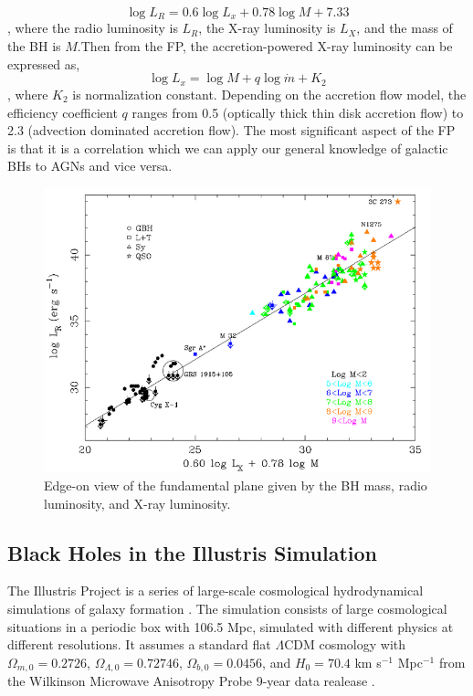 \documentclass[12pt]{article}
\begin{document}
\begin{equation}
\log L_R=0.6 \log L_x+0.78 \log M+7.33
\end{equation}
, where the radio luminosity is $L_R$, the X-ray luminosity is $L_X$, and the mass of the BH is $M$.Then from the FP, the accretion-powered X-ray luminosity can be expressed as,
\begin{equation}
\log L_x = \log M+q \log \dot{m}+K_2
\label{LxFP}
\end{equation}
, where $K_2$ is normalization constant. Depending on the accretion flow model, the efficiency coefficient $q$ ranges from 0.5 (optically thick thin disk accretion flow) to 2.3 (advection dominated accretion flow). The most significant aspect of the FP is that it is a correlation which we can apply our general knowledge of galactic BHs to AGNs and vice versa.

\begin{figure}
\centering
\includegraphics[width=13.5cm]{FP.png}
\caption{Edge-on view of the fundamental plane given by the BH mass, radio luminosity, and X-ray luminosity. \cite{Merloni2003} \label{FP}}
\end{figure}

\subsection{Black Holes in the Illustris Simulation}
The Illustris Project is a series of large-scale cosmological hydrodynamical simulations of galaxy formation \cite{Vogelsberg2014}. The simulation consists of large cosmological situations in a periodic box with 106.5 Mpc, simulated with different physics at different resolutions. It assumes a standard flat $\Lambda$CDM cosmology with $\Omega_{m,0}=0.2726$, $\Omega_{\Lambda,0}=0.72746$, $\Omega_{b,0}=0.0456$, and $H_{0}=70.4$ km s$^{-1}$ Mpc$^{-1}$ from the Wilkinson Microwave Anisotropy Probe 9-year data realease \cite{Hinshaw2013}. 
\end{document}
